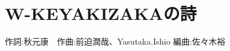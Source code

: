 \section{W-KEYAKIZAKAの詩}

\begin{center}
    \scriptsize{
        作詞:秋元康　作曲:前迫潤哉、Yasutaka.Ishio	編曲:佐々木裕
    }
\end{center}

\vspace{0.7em}

\begin{Parallel}[c]{0.47\textwidth}{0.47\textwidth}

\ParallelLText{
    \footnotesize{
        
    }
}

\ParallelRText{
    \footnotesize{
        
    }
}

\end{Parallel}

